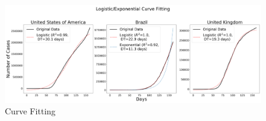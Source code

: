 \begin{appendices}
\begin{figure}[ht!]%
    \centering
    \includegraphics[width=15.5cm]{latex/images/fitting.PNG}%
    \caption{Curve Fitting}
\end{figure}

% 
% 

% 

% 



% 


\end{appendices}
